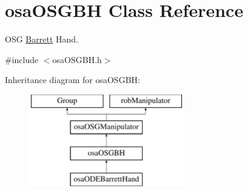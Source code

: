 \hypertarget{classosa_o_s_g_b_h}{\section{osa\-O\-S\-G\-B\-H Class Reference}
\label{classosa_o_s_g_b_h}
}


O\-S\-G \hyperlink{struct_barrett}{Barrett} Hand.  




{\ttfamily \#include $<$osa\-O\-S\-G\-B\-H.\-h$>$}

Inheritance diagram for osa\-O\-S\-G\-B\-H\-:\begin{figure}[H]
\begin{center}
\leavevmode
\includegraphics[height=4.000000cm]{de/d25/classosa_o_s_g_b_h}
\end{center}
\end{figure}

